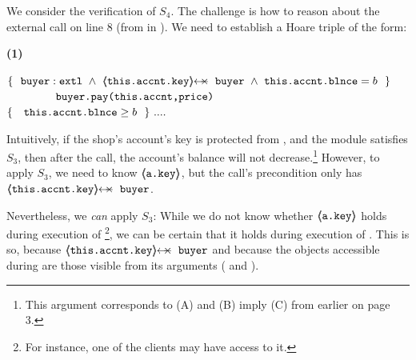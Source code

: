 We consider  the  verification of $S_4$. 
The challenge is how to reason  about the external call on line 8 (from  in ). 
We need to establish a Hoare triple of the form:

  \begin{minipage}{.05\textwidth}
   \textbf{(1)}
\end{minipage}
\hfill
\begin{minipage}{.95\textwidth}
\begin{flushleft}
$\{\  \ { \external{\prg{buyer}}} \ \wedge\ {\protectedFrom {\prg{this.\myAccount.key}} {\prg{buyer}}\ \wedge\ {\prg{this.\myAccount.\balance}}= b    }\ \  \}$\\
$\ \ \ \ \ \ \ \ \ \ \ \ {\ \prg{buyer.pay(this.accnt,price)}   \ } $\\
$  \{\  \ \  {\mbox{\normalfont{\texttt{this.\mbox{\normalfont{\texttt{accnt}}}.\mbox{\normalfont{\texttt{blnce}}}}}}} \geq  b \  \  \}\ .... $ 
\end{flushleft}
\end{minipage}
 
 \vspace{.05cm}
Intuitively, if the shop's account's key is protected from , %
 and the module satisfies $S_3$,  %
 then after the call, the account's balance will not decrease.\footnote{This argument corresponds to (A) and (B) imply (C) from earlier on page 3.} %
%
However, %
to apply $S_3$, we   need to know  ${\langle\!\!\langle \mbox{\normalfont{\texttt{a.key}}} \rangle\!\!\rangle} $,  but  the call's precondition only has $\protectedFrom{\prg{this.\myAccount.key}}{\prg{buyer}}$. 



Nevertheless, we \emph{can} apply $S_3$: While we do not know whether 
${\langle\!\!\langle \mbox{\normalfont{\texttt{a.key}}} \rangle\!\!\rangle}$ holds  %
during  execution of \footnote{For instance, one of the clients may have access to it.}, we can be certain 
that it holds during execution of .  This is so, because $\protectedFrom{\prg{this.\myAccount.key}}{\prg{buyer}}$
and because the objects accessible during  are those visible from its arguments (\ie {} and ).

